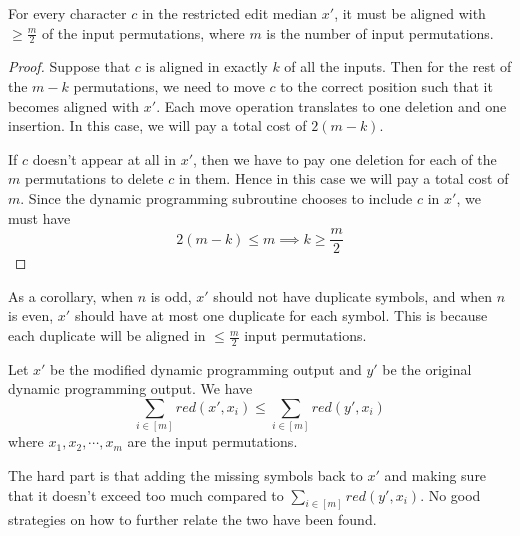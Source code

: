 \begin{lemma}
   For every character $c$ in the restricted edit median $x'$, it must be aligned with $\geq \frac{m}{2}$ of the input permutations, where $m$ is the number of input permutations.
\end{lemma}

\begin{proof}
   Suppose that $c$ is aligned in exactly $k$ of all the inputs. Then for the rest of the $m - k$ permutations, we need to move $c$ to the correct position such that it becomes aligned with $x'$. Each move operation translates to one deletion and one insertion. In this case, we will pay a total cost of $2(m - k)$.

   If $c$ doesn't appear at all in $x'$, then we have to pay one deletion for each of the $m$ permutations to delete $c$ in them. Hence in this case we will pay a total cost of $m$. Since the dynamic programming subroutine chooses to include $c$ in $x'$, we must have
   \[2(m - k) \leq m \implies k \geq \frac{m}{2}\]
\end{proof}

As a corollary, when $n$ is odd, $x'$ should not have duplicate symbols, and when $n$ is even, $x'$ should have at most one duplicate for each symbol. This is because each duplicate will be aligned in $\leq \frac{m}{2}$ input permutations.

Let $x'$ be the modified dynamic programming output and $y'$ be the original dynamic programming output. We have
\[\sum_{i \in [m]} red(x', x_i) \leq \sum_{i \in [m]} red(y', x_i)\]
where $x_1, x_2, \cdots, x_m$ are the input permutations.

The hard part is that adding the missing symbols back to $x'$ and making sure that it doesn't exceed too much compared to $\sum\limits_{i \in [m]} red(y', x_i)$. No good strategies on how to further relate the two have been found.
